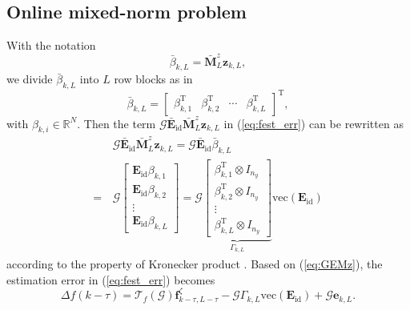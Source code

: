 \documentclass[twocolumn]{autart}
\begin{document}
\subsection{Online mixed-norm problem}
With the notation
\begin{equation}\label{eq:bar_beta}
\bar \beta_{k,L} = \mathbf{\bar M}_L^z \mathbf{z}_{k,L},
\end{equation}
we divide $\bar \beta_{k,L}$ into $L$ row blocks as in
\begin{equation}\label{eq:bar_beta_i}
\bar \beta_{k,L} = \left[ \begin{array}{cccc}
                            \beta_{k,1}^\mathrm{T} & \beta_{k,2}^\mathrm{T} & \cdots & \beta_{k,L}^\mathrm{T}
                          \end{array}
 \right]^\mathrm{T},
\end{equation}
with $\beta_{k,i} \in \mathbb{R}^{N}$. Then the term $\mathcal{G} \mathbf{\bar E}_{\mathrm{id}} \mathbf{\bar M}_L^z \mathbf{z}_{k,L}$ in (\ref{eq:fest_err}) can be rewritten as
\begin{equation}\label{eq:GEMz}
\begin{aligned}
&\,\mathcal{G} \mathbf{\bar E}_{\mathrm{id}} \mathbf{\bar M}_L^z \mathbf{z}_{k,L}
= \mathcal{G} \mathbf{\bar E}_{\mathrm{id}} \bar \beta_{k,L} \\
=&\, \mathcal{G}
\left[ \begin{array}{c}
         \mathbf{E}_{\mathrm{id}} \beta_{k,1} \\
         \mathbf{E}_{\mathrm{id}} \beta_{k,2} \\
         \vdots \\
         \mathbf{E}_{\mathrm{id}} \beta_{k,L}
       \end{array} \right]
= \mathcal{G}
\underbrace{\left[ \begin{array}{c}
         \beta_{k,1}^\mathrm{T} \otimes I_{n_y} \\
         \beta_{k,2}^\mathrm{T} \otimes I_{n_y} \\
         \vdots \\
         \beta_{k,L}^\mathrm{T} \otimes I_{n_y}
       \end{array} \right]}_{{\Gamma_{k,L}}}
  \mathrm{vec}\left( \mathbf{E}_{\mathrm{id}} \right)
\end{aligned}
\end{equation}
according to the property of Kronecker product \cite{Brew1978}. Based on (\ref{eq:GEMz}), the estimation error in (\ref{eq:fest_err}) becomes
\begin{equation}
\Delta f(k-\tau) = \mathcal{T}_{f} \left( \mathcal{G} \right) \mathbf{f}_{k-\tau,L-\tau}^\zeta - \mathcal{G} \Gamma_{k,L}  \mathrm{vec}\left( \mathbf{E}_{\mathrm{id}} \right) + \mathcal{G} \mathbf{e}_{k,L}.
\end{equation}
\end{document}

